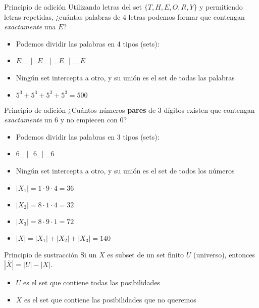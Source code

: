 \documentclass[10pt]{beamer}
\newcommand{\bi}{\begin{itemize}}
\newcommand{\ei}{\end{itemize}}
\begin{document}
\begin{frame}{Principio de adición}
  Utilizando letras del set $\{T, H, E, O, R, Y\}$ y permitiendo letras repetidas, 
  ¿cuántas palabras de 4 letras podemos formar que contengan \textit{exactamente} una $E$?

  \bi
    \item Podemos dividir las palabras en 4 tipos (sets):
    \item $E\_\_\_$ | $\_E\_\_$ | $\_\_E\_$ | $\_\_\_E$
    \item Ningún set intercepta a otro, y su unión es el set de todas las palabras
    \item<3-> $5^3 + 5^3 + 5^3 + 5^3 = 500$
  \ei
\end{frame}

\begin{frame}{Principio de adición}
  ¿Cuántos números \textbf{pares} de 3 dígitos existen que contengan \textit{exactamente} un $6$ 
  y no empiecen con $0$?

  \bi
    \item Podemos dividir las palabras en 3 tipos (sets):
    \item $6\_\_$ | $\_6\_$ | $\_\_6$
    \item Ningún set intercepta a otro, y su unión es el set de todos los números
    \item<3-> $|X_1| = 1 \cdot 9 \cdot 4 = 36$
    \item<3-> $|X_2| = 8 \cdot 1 \cdot 4 = 32$
    \item<3-> $|X_3| = 8 \cdot 9 \cdot 1 = 72$
    \item<4-> $|X| = |X_1| + |X_2| + |X_3| = 140$
  \ei
\end{frame}

\begin{frame}{Principio de sustracción}
  Si un  $X$ es subset de un set finito $U$ (universo), entonces $|\overline{X}| = |U| - |X|$.

  \bi
    \item<2-> $U$ es el set que contiene todas las posibilidades
    \item<2-> $X$ es el set que contiene las posibilidades que no queremos
  \ei
\end{frame}
\end{document}
